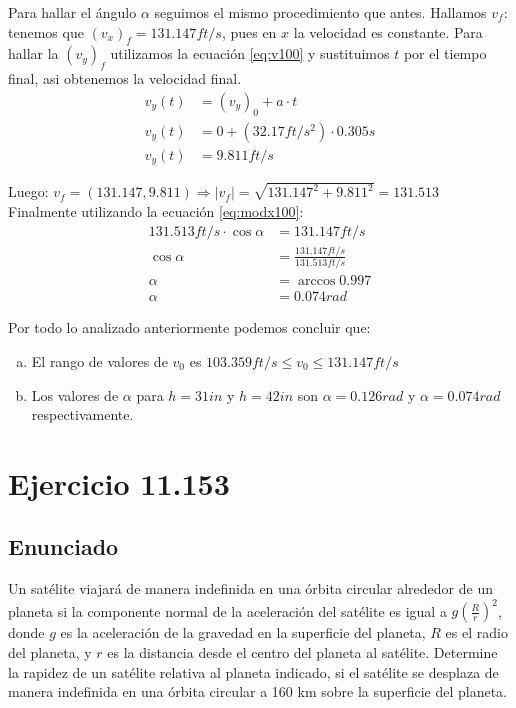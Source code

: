 \documentclass[11pt]{article}
\begin{document}
Para hallar el ángulo $\alpha$ seguimos el mismo procedimiento que antes.
Hallamos $v_f$: tenemos que $(v_x)_f = 131.147 ft/s$, pues en $x$ la velocidad es constante.
Para hallar la $(v_y)_f$ utilizamos la ecuación \ref{eq:v100} y sustituimos $t$ por el 
tiempo final, asi obtenemos la velocidad final.
\begin{align*}
  v_y(t) &= (v_y)_0 + a \cdot t \\
  v_y(t) &= 0 + (32.17ft/s^2) \cdot 0.305s \\
  v_y(t) &= 9.811ft/s
\end{align*}

Luego: $v_f = (131.147, 9.811) \Rightarrow \vert v_f \vert = \sqrt{131.147^2 + 9.811^2} = 131.513$ \\

Finalmente utilizando la ecuación \ref{eq:modx100}:
\begin{align*}
  131.513ft/s \cdot \cos \alpha &= 131.147ft/s \\
   \cos \alpha &= \frac{131.147ft/s}{131.513ft/s} \\
   \alpha &= \arccos 0.997 \\
   \alpha &= 0.074rad
\end{align*}

Por todo lo analizado anteriormente podemos concluir que:

\begin{enumerate}[a)]
  \item El rango de valores de $v_0$ es $103.359f t/s \leq v_0 \leq 131.147f t/s$ 
  \item Los valores de $\alpha$ para $h = 31in$ y $h = 42in$ son $\alpha = 0.126rad$ 
        y $\alpha = 0.074rad$ respectivamente.
\end{enumerate}


\section*{Ejercicio 11.153}

\subsection*{Enunciado}

Un satélite viajará de manera indefinida en una órbita circular alrededor de un
planeta si la componente normal de la aceleración del satélite es igual
a $g{(\frac{R}{r})}^2$, donde $g$ es la aceleración de la gravedad
en la superficie del planeta, $R$ es el radio del planeta, y $r$ es la distancia desde
el centro del planeta al satélite. Determine la rapidez de un satélite relativa
al planeta indicado, si el satélite se desplaza de manera indefinida en una órbita
circular a 160 km sobre la superficie del planeta.
\end{document}
